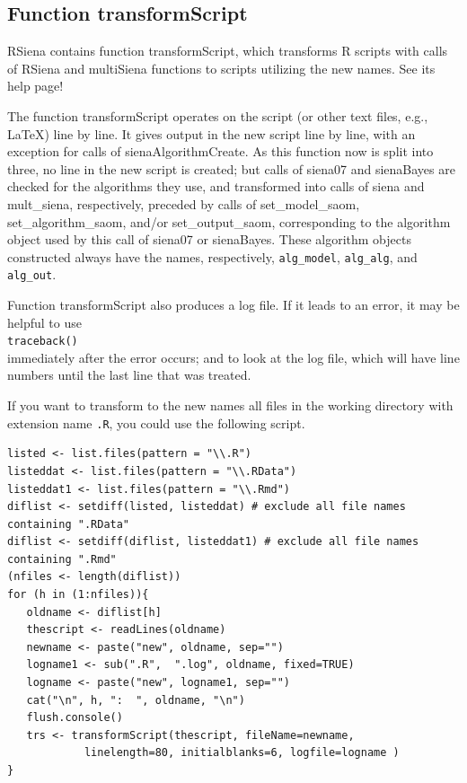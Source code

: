 \documentclass[a4paper,fleqn,11pt]{article}
\newcommand{\+}{\, + \,}
\newcommand{\sfn}[1]{\textsf{#1}}
\newcommand{\RS}{{\sf \textsf{RSiena} }}
\newcommand{\MS}{{\sf multiSiena }}
\begin{document}
\subsection{Function \sfn{transformScript}}
\RS contains function \sfn{transformScript}, which
transforms R scripts with calls of \RS and \MS
functions to scripts utilizing the new names.
See its help page!

The function \sfn{transformScript} operates on the script (or other text files,
e.g., \LaTeX)  line by line.
It gives output in the new script line by line, with an exception
for calls of \sfn{sienaAlgorithmCreate}.
As this function now is split into three, no line in the new script
is created; but calls of \sfn{siena07} and \sfn{sienaBayes} are
checked for the algorithms they use, and transformed into  calls of \sfn{siena}
and \sfn{mult\_siena}, respectively, preceded by calls of
\sfn{set\_model\_saom}, \sfn{set\_algorithm\_saom}, and/or
\sfn{set\_output\_saom},
corresponding to the algorithm object used by this call of
\sfn{siena07} or \sfn{sienaBayes}.
These algorithm objects constructed always have the names, respectively,
\texttt{alg\_model}, \texttt{alg\_alg}, and \texttt{alg\_out}.
\medskip

Function \sfn{transformScript} also produces a log file.
If it leads to an error, it may be helpful to use\\
\texttt{traceback()}\\
immediately after the error occurs; and to look at
the log file, which will have line numbers until the last
line that was treated.
\bigskip

If you want to transform to the new names
all files in the working directory with extension name \texttt{.R},
you could use the following script.

{\small
\begin{verbatim}
listed <- list.files(pattern = "\\.R")
listeddat <- list.files(pattern = "\\.RData")
listeddat1 <- list.files(pattern = "\\.Rmd")
diflist <- setdiff(listed, listeddat) # exclude all file names containing ".RData"
diflist <- setdiff(diflist, listeddat1) # exclude all file names containing ".Rmd"
(nfiles <- length(diflist))
for (h in (1:nfiles)){
   oldname <- diflist[h]
   thescript <- readLines(oldname)
   newname <- paste("new", oldname, sep="")
   logname1 <- sub(".R",  ".log", oldname, fixed=TRUE)
   logname <- paste("new", logname1, sep="")
   cat("\n", h, ":  ", oldname, "\n")
   flush.console()
   trs <- transformScript(thescript, fileName=newname,
            linelength=80, initialblanks=6,	logfile=logname )
}
\end{verbatim}
}
\end{document}
